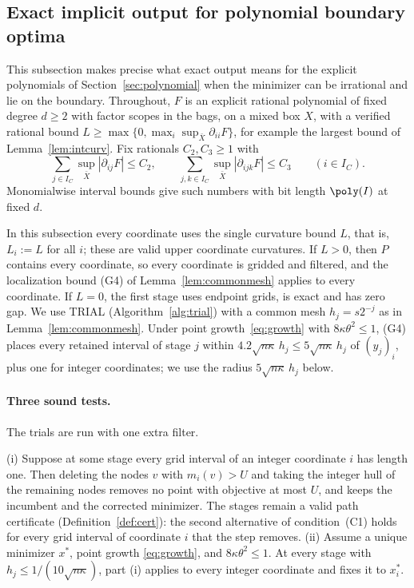 \subsection{Exact implicit output for polynomial boundary optima}\label{app:boundary}

This subsection makes precise what exact output means for the explicit
polynomials of Section~\ref{sec:polynomial} when the minimizer can be
irrational and lie on the boundary. Throughout, $F$ is an explicit rational
polynomial of fixed degree $d\ge2$ with factor scopes in the bags, on a mixed
box $X$, with a verified rational bound
$L\ge\max\{0,\max_i\sup_{\bar X}\partial_{ii}F\}$,
for example the largest bound of Lemma~\ref{lem:intcurv}. Fix rationals
$C_2,C_3\ge1$ with
\[
\sum_{j\in I_C}\sup_{\bar X}|\partial_{ij}F|\le C_2,\qquad
\sum_{j,k\in I_C}\sup_{\bar X}|\partial_{ijk}F|\le C_3
\qquad(i\in I_C).
\]
Monomialwise interval bounds give such numbers with bit length $\poly(I)$
at fixed $d$.

In this subsection every coordinate uses the single curvature bound $L$, that
is, $L_i:=L$ for all $i$; these are valid upper coordinate curvatures. If
$L>0$, then $P$ contains every coordinate, so every coordinate is gridded and
filtered, and the localization bound (G4) of Lemma~\ref{lem:commonmesh}
applies to every coordinate. If $L=0$, the first stage uses endpoint grids,
is exact and has zero gap. We use TRIAL (Algorithm~\ref{alg:trial}) with a
common mesh $h_j=s2^{-j}$ as in Lemma~\ref{lem:commonmesh}. Under point
growth~\eqref{eq:growth} with $8\kappa\theta^2\le1$, (G4) places every
retained interval of stage $j$ within
$4.2\sqrt{n\kappa}\,h_j\le5\sqrt{n\kappa}\,h_j$ of $(y_j)_i$, plus one for
integer coordinates; we use the radius $5\sqrt{n\kappa}\,h_j$ below.

\paragraph{Three sound tests.}
The trials are run with one extra filter.

\begin{lemma}\label{lem:labelfilter}
(i) Suppose at some stage every grid interval of an integer coordinate $i$
has length one. Then deleting the nodes $v$ with $m_i(v)>U$ and taking the
integer hull of the remaining nodes removes no point with objective at most
$U$, and keeps the incumbent and the corrected minimizer. The stages remain a
valid path certificate (Definition~\ref{def:cert}): the second alternative of
condition~(C1) holds for every grid interval of coordinate $i$ that the step
removes.
(ii) Assume a unique minimizer $x^*$, point growth \eqref{eq:growth}, and
$8\kappa\theta^2\le1$. At every stage with $h_j\le1/(10\sqrt{n\kappa})$,
part (i) applies to every integer coordinate and fixes it to $x^*_i$.
\end{lemma}

